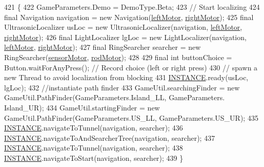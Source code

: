 \begin{DoxyCode}
421                                                   \{
422     GameParameters.Demo = DemoType.Beta;
423     \textcolor{comment}{// Start localizing}
424     \textcolor{keyword}{final} Navigation navigation = \textcolor{keyword}{new} Navigation(\hyperlink{enumca_1_1mcgill_1_1ecse211_1_1project_1_1_game_a7c673571bf50fdb6917a9d7bb671e003}{leftMotor}, \hyperlink{enumca_1_1mcgill_1_1ecse211_1_1project_1_1_game_a7a05fcf37c4435c32270776a427ba0d2}{rightMotor});
425     \textcolor{keyword}{final} UltrasonicLocalizer usLoc = \textcolor{keyword}{new} UltrasonicLocalizer(navigation, 
      \hyperlink{enumca_1_1mcgill_1_1ecse211_1_1project_1_1_game_a7c673571bf50fdb6917a9d7bb671e003}{leftMotor}, \hyperlink{enumca_1_1mcgill_1_1ecse211_1_1project_1_1_game_a7a05fcf37c4435c32270776a427ba0d2}{rightMotor});
426     \textcolor{keyword}{final} LightLocalizer lgLoc = \textcolor{keyword}{new} LightLocalizer(navigation, \hyperlink{enumca_1_1mcgill_1_1ecse211_1_1project_1_1_game_a7c673571bf50fdb6917a9d7bb671e003}{leftMotor}, 
      \hyperlink{enumca_1_1mcgill_1_1ecse211_1_1project_1_1_game_a7a05fcf37c4435c32270776a427ba0d2}{rightMotor});
427     \textcolor{keyword}{final} RingSearcher searcher = \textcolor{keyword}{new} RingSearcher(\hyperlink{enumca_1_1mcgill_1_1ecse211_1_1project_1_1_game_aa94b85dc88de85d959677bd6c0f98989}{sensorMotor}, 
      \hyperlink{enumca_1_1mcgill_1_1ecse211_1_1project_1_1_game_abc070af2fa5a5cda6d81977b35aacfb4}{rodMotor});
428     
429     \textcolor{keyword}{final} \textcolor{keywordtype}{int} buttonChoice = Button.waitForAnyPress(); \textcolor{comment}{// Record choice (left or right press)}
430     \textcolor{comment}{// spawn a new Thread to avoid localization from blocking}
431         \hyperlink{enumca_1_1mcgill_1_1ecse211_1_1project_1_1_game_a6584b6534b14ba43dc1444084a925a20}{INSTANCE}.ready(usLoc, lgLoc);
432         \textcolor{comment}{//instantiate path finder}
433         GameUtil.searchingFinder = \textcolor{keyword}{new} GameUtil.PathFinder(GameParameters.Island\_LL, GameParameters.
      Island\_UR);
434         GameUtil.startingFinder = \textcolor{keyword}{new} GameUtil.PathFinder(GameParameters.US\_LL, GameParameters.US\_UR);
435         \hyperlink{enumca_1_1mcgill_1_1ecse211_1_1project_1_1_game_a6584b6534b14ba43dc1444084a925a20}{INSTANCE}.navigateToTunnel(navigation, searcher);
436         \hyperlink{enumca_1_1mcgill_1_1ecse211_1_1project_1_1_game_a6584b6534b14ba43dc1444084a925a20}{INSTANCE}.navigateToAndSearcherTree(navigation, searcher);
437         \hyperlink{enumca_1_1mcgill_1_1ecse211_1_1project_1_1_game_a6584b6534b14ba43dc1444084a925a20}{INSTANCE}.navigateToTunnel(navigation, searcher);
438         \hyperlink{enumca_1_1mcgill_1_1ecse211_1_1project_1_1_game_a6584b6534b14ba43dc1444084a925a20}{INSTANCE}.navigateToStart(navigation, searcher);
439   \}
\end{DoxyCode}


